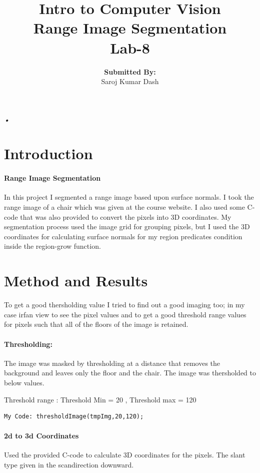 \documentclass{article}
\title{\textbf{Intro to Computer Vision \\Range Image Segmentation \\Lab-8}\vfill{}}
\author{\textbf{Submitted By:}\\Saroj Kumar Dash}
\begin{document}
	\begin{titlepage}
		\maketitle
	\end{titlepage}
	
\newpage	

\textsl{•}\section{Introduction}
\paragraph{Range Image Segmentation}
In this project I segmented a range image based upon surface normals. I took the range image of a chair which was given at the course website. I also used some C-code that was also provided to convert the pixels into 3D coordinates. My segmentation process used the image grid for grouping pixels, but I used the 3D coordinates for calculating surface normals for my region predicates condition inside the region-grow function.

\section{Method and Results}
To get a good thersholding value I tried to find out a good imaging too; in my case irfan view to see the pixel values and to get a good threshold range values for pixels such that all of the floors of the image is retained.  \paragraph{Thresholding:}
The image was masked by thresholding at a distance that removes the background and leaves only the floor and the chair. The image was thersholded to below values.

Threshold range : Threshold Min = 20 , Threshold max = 120
\begin{lstlisting}
My Code: thresholdImage(tmpImg,20,120);
\end{lstlisting}


\paragraph{2d to 3d Coordinates}
Used the provided C-code to calculate 3D coordinates for the pixels. The slant type given in the scandirection downward.
\end{document}
